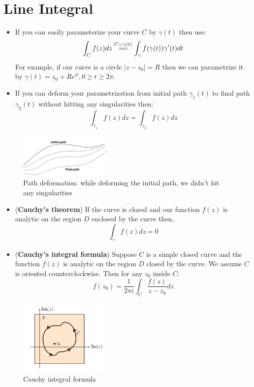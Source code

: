 \chapter{Line Integral}
\begin{itemize}
    \item If you can easily parameterize your curve $C$ by $\gamma(t)$ then use: 
    $$\int_Cf(z)dz\stackrel{C=\gamma(t)}{=\joinrel=}\int_\gamma f(\gamma(t))\gamma'(t)dt$$
    For example, if our curve is a circle $|z-z_0|=R$ then we can parametrize it by $\gamma(t)=z_0+Re^{it},0\geq t\geq 2\pi$.     
    \item If you can deform your parametrization from initial path $\gamma_1(t)$ to final path $\gamma_2(t)$ without hitting any singularities then:
    $$\int_{\gamma_1}f(z)dz=\int_{\gamma_2}f(z)dz$$
\end{itemize}
\begin{figure}[h]
    \centering
    \includegraphics[width=0.4\textwidth]{FIG_MAT215/path deform.png}
    \caption{Path deformation: while deforming the initial path, we didn't hit any singularities}
    \label{fig:path_deform}
\end{figure}
\begin{itemize}
    \item (\textbf{Cauchy's theorem}) If the curve is closed and our function $f(z)$ is analytic on the region $D$ enclosed by the curve then, 
    $$\int_\gamma f(z)dz=0$$
    \item (\textbf{Cauchy's integral formula}) Suppose $C$ is a simple closed curve and the function $f(z)$ is analytic on the region $D$ closed by the curve. We assume $C$ is oriented counterclockwise. Then for any $z_0$ inside $C$: $$f(z_0)=\frac{1}{2\pi i}\int_C \frac{f(z)}{z-z_0}dz$$
\end{itemize}
\begin{figure}[h]
    \centering
    \includegraphics[width=0.4\textwidth]{FIG_MAT215/cauchy_formula_temp.PNG}
    \caption{Cauchy integral formula}
    \label{fig:CIF}
\end{figure}
